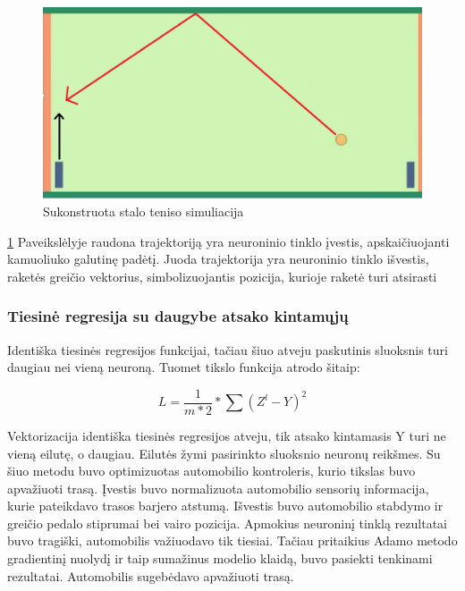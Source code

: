 \documentclass[a4paper, 12pt]{article}
\begin{document}
\begin{figure}[h]
\centering
\includegraphics[width=1\textwidth]{pingpong}
\caption{Sukonstruota stalo teniso simuliacija}
\label{pingpong}
\end{figure}

\ref{pingpong} Paveikslėlyje raudona trajektoriją yra neuroninio tinklo įvestis, apskaičiuojanti kamuoliuko galutinę padėtį. Juoda trajektorija yra neuroninio tinklo išvestis, raketės greičio vektorius, simbolizuojantis pozicija, kurioje raketė turi atsirasti

%
\subsubsection{Tiesinė regresija su daugybe atsako kintamųjų}
%

Identiška tiesinės regresijos funkcijai, tačiau šiuo atveju paskutinis sluoksnis turi daugiau nei vieną neuroną. Tuomet tikslo funkcija atrodo šitaip:

\begin{equation}
L=\frac{1}{m * 2} * \sum\left(Z^{l}-Y\right)^{2}
\end{equation}

Vektorizacija identiška tiesinės regresijos atveju, tik atsako kintamasis Y turi ne vieną eilutę, o daugiau. Eilutės žymi pasirinkto sluoksnio neuronų reikšmes.
Su šiuo metodu buvo optimizuotas automobilio kontroleris, kurio tikslas buvo apvažiuoti trasą. Įvestis buvo normalizuota automobilio sensorių informacija, kurie pateikdavo trasos barjero atstumą. Išvestis buvo automobilio stabdymo ir greičio pedalo stiprumai bei vairo pozicija. Apmokius neuroninį tinklą rezultatai buvo tragiški, automobilis važiuodavo tik tiesiai. Tačiau pritaikius Adamo metodo gradientinį nuolydį ir taip sumažinus modelio klaidą, buvo pasiekti tenkinami rezultatai. Automobilis sugebėdavo apvažiuoti trasą. 
\end{document}
